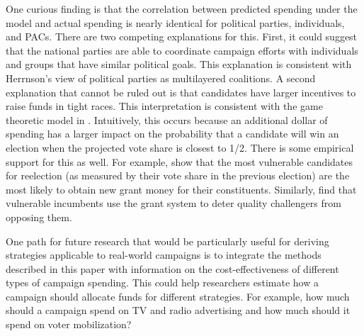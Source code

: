 \documentclass[12pt,final,fleqn]{article}
\theoremstyle{plain}
\begin{document}
One curious finding is that the correlation between predicted spending under the model and actual spending is nearly identical for political parties, individuals, and PACs. There are two competing explanations for this. First, it could suggest that the national parties are able to coordinate campaign efforts with individuals and groups that have similar political goals. This explanation is consistent with Herrnson's \citeyear{herrnson2009roles} view of political parties as multilayered coalitions. A second explanation that cannot be ruled out is that candidates have larger incentives to raise funds in tight races. This interpretation is consistent with the game theoretic model in \citet{erikson2000equilibria}. Intuitively, this occurs because an additional dollar of spending has a larger impact on the probability that a candidate will win an election when the projected vote share is closest to 1/2. There is some empirical support for this as well. For example, \citet{stein1994congressional} show that the most vulnerable candidates for reelection (as measured by their vote share in the previous election) are the most likely to obtain new grant money for their constituents. Similarly, \citet{bickers1996electoral} find that vulnerable incumbents use the grant system to deter quality challengers from opposing them.

One path for future research that would be particularly useful for deriving strategies applicable to real-world campaigns is to integrate the methods described in this paper with information on the cost-effectiveness of different types of campaign spending. This could help researchers estimate how a campaign should allocate funds for different strategies. For example, how much should a campaign spend on TV and radio advertising and how much should it spend on voter mobilization?


\end{document}

